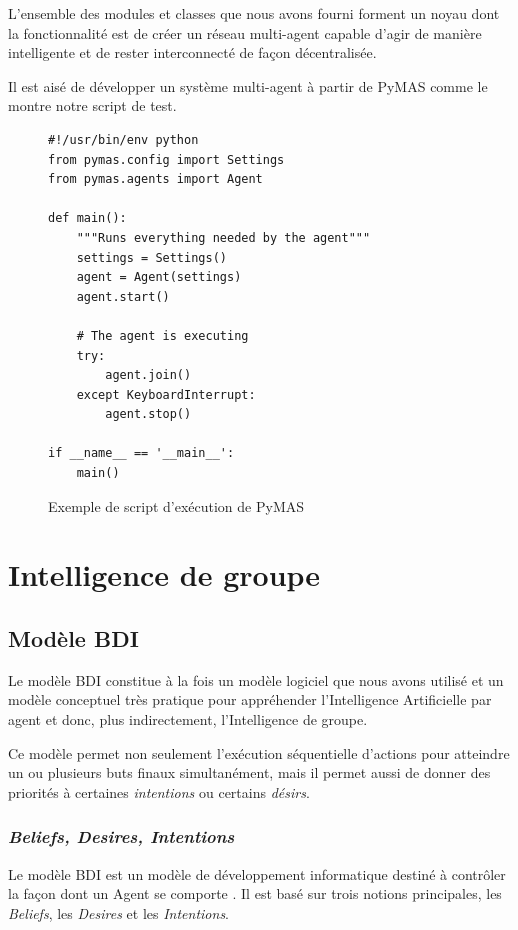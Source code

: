 \documentclass[11pt]{book}
\begin{document}
L’ensemble des modules et classes que nous avons fourni forment un noyau 
dont la fonctionnalité est de créer un réseau multi-agent capable d'agir de 
manière intelligente et de rester interconnecté de façon décentralisée.

Il est aisé de développer un système multi-agent à partir de PyMAS comme le 
montre notre script de test.

\begin{figure}[ht]
\begin{lstlisting}[style=python]
#!/usr/bin/env python
from pymas.config import Settings
from pymas.agents import Agent

def main():
    """Runs everything needed by the agent"""
    settings = Settings()
    agent = Agent(settings)
    agent.start()

    # The agent is executing
    try:
        agent.join()
    except KeyboardInterrupt:
        agent.stop()

if __name__ == '__main__':
    main()

\end{lstlisting}
\caption{Exemple de script d'exécution de PyMAS}
\end{figure}

\chapter{Intelligence de groupe}
\section{Modèle BDI}
Le modèle BDI \cite{bratman} constitue à la fois un modèle logiciel que nous 
avons utilisé et un modèle conceptuel très pratique pour appréhender 
l'Intelligence Artificielle par agent et donc, plus indirectement, 
l'Intelligence de groupe.

Ce modèle permet non seulement l'exécution séquentielle d'actions pour 
atteindre un ou plusieurs buts finaux simultanément, mais il permet aussi 
de donner des priorités à certaines \textit{intentions} ou certains 
\textit{désirs}.


\subsection{\textit{Beliefs, Desires, Intentions}}
Le modèle BDI est un modèle de développement informatique destiné à 
contrôler la façon dont un Agent se comporte \cite{haddadi1996belief}. Il 
est basé sur trois notions principales, les \textit{Beliefs}, les 
\textit{Desires} et les \textit{Intentions}.
\end{document}

